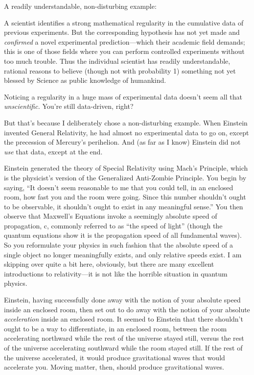 {
 A readily understandable, non-disturbing example:}

{
 A scientist identifies a strong mathematical regularity in the
cumulative data of previous experiments. But the corresponding
hypothesis has not yet made and \textit{confirmed} a novel experimental
prediction---which their academic field demands; this is one of those
fields where you can perform controlled experiments without too much
trouble. Thus the individual scientist has readily understandable,
rational reasons to believe (though not with probability 1) something
not yet blessed by Science as public knowledge of humankind.}

{
 Noticing a regularity in a huge mass of experimental data
doesn't seem all that \textit{unscientific.}
You're still data-driven, right?}

{
 But that's because I deliberately chose a
non-disturbing example. When Einstein invented General Relativity, he
had almost no experimental data to go on, except the precession of
Mercury's perihelion. And (as far as I know) Einstein
did not \textit{use} that data, except at the end.}

{
 Einstein generated the theory of Special Relativity using
Mach's Principle, which is the
physicist's version of the Generalized Anti-Zombie
Principle. You begin by saying, ``It
doesn't seem reasonable to me that you could tell, in
an enclosed room, how fast you and the room were going. Since this
number shouldn't ought to be observable, it
shouldn't ought to exist in any meaningful
sense.'' You then observe that
Maxwell's Equations invoke a seemingly absolute speed
of propagation, c, commonly referred to as ``the speed
of light'' (though the quantum equations show it is
the propagation speed of all fundamental waves). So you reformulate
your physics in such fashion that the absolute speed of a single object
no longer meaningfully exists, and only relative speeds exist. I am
skipping over quite a bit here, obviously, but there are many excellent
introductions to relativity---it is not like the horrible situation in
quantum physics.}

{
 Einstein, having successfully done away with the notion of your
absolute speed inside an enclosed room, then set out to do away with
the notion of your absolute \textit{acceleration} inside an enclosed
room. It seemed to Einstein that there shouldn't ought
to be a way to differentiate, in an enclosed room, between the room
accelerating northward while the rest of the universe stayed still,
versus the rest of the universe accelerating southward while the room
stayed still. If the rest of the universe accelerated, it would produce
gravitational waves that would accelerate you. Moving matter, then,
should produce gravitational waves.}

